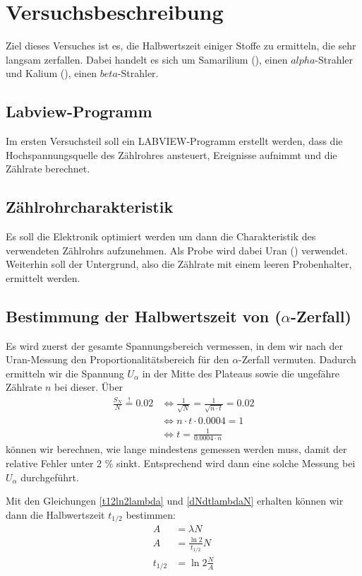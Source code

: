 \section{Versuchsbeschreibung}

Ziel dieses Versuches ist es, die Halbwertszeit einiger Stoffe zu ermitteln, die sehr langsam zerfallen. Dabei handelt es sich um Samarilium (), einen $alpha$-Strahler und Kalium (), einen $beta$-Strahler.

\subsection{Labview-Programm}
Im ersten Versuchsteil soll ein LABVIEW-Programm erstellt werden, dass die Hochspannungsquelle des Zählrohres ansteuert, Ereignisse aufnimmt und die Zählrate berechnet.

\subsection{Zählrohrcharakteristik}
Es soll die Elektronik optimiert werden um dann die Charakteristik des verwendeten Zählrohrs aufzunehmen. Als Probe wird dabei Uran () verwendet. Weiterhin soll der Untergrund, also die Zählrate mit einem leeren Probenhalter, ermittelt werden.

\subsection{Bestimmung der Halbwertszeit von  ($\alpha$-Zerfall)}
Es wird zuerst der gesamte Spannungsbereich vermessen, in dem wir nach der Uran-Messung den Proportionalitätsbereich für den $\alpha$-Zerfall vermuten. Dadurch ermitteln wir die Spannung $U_{\alpha}$ in der Mitte des Plateaus sowie die ungefähre Zählrate $n$ bei dieser. Über
\begin{align}
 \frac{S_N}{N} \stackrel{!}{=} 0.02 & \Leftrightarrow \frac{1}{\sqrt{N}} = \frac{1}{\sqrt{n \cdot t}} = 0.02 \\
				   & \Leftrightarrow n \cdot t \cdot 0.0004 = 1 \\
				   & \Leftrightarrow t = \frac{1}{0.0004 \cdot n} \label{zeitfuerkleinenfehler}
\end{align}
können wir berechnen, wie lange mindestens gemessen werden muss, damit der relative Fehler unter 2 \% sinkt. Entsprechend wird dann eine solche Messung bei $U_{\alpha}$ durchgeführt.

Mit den Gleichungen \ref{t12ln2lambda} und \ref{dNdtlambdaN} erhalten können wir dann die Halbwertszeit $t_{1/2}$ bestimmen:
\begin{align}
 A & = \lambda N \\
 A &= \frac{\ln 2}{t_{1/2}}N \\
 t_{1/2} & = \ln 2 \frac{N}{A} \label{anfangt12alpha}
\end{align}

